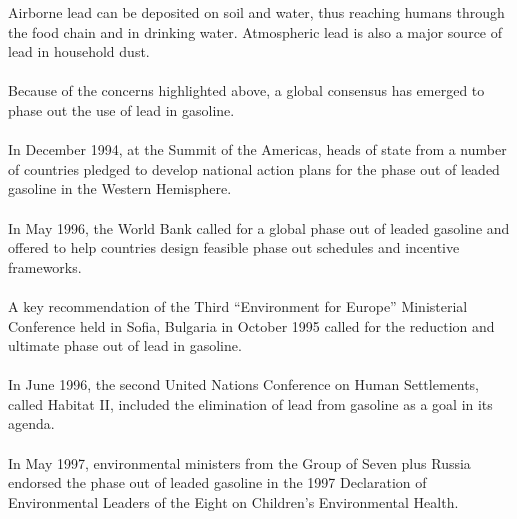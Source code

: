 Airborne lead can be deposited on soil and water, thus reaching humans through the food chain and in drinking water. Atmospheric lead is also a major source of lead in household dust.\\\\
Because of the concerns highlighted above, a global consensus has emerged to phase out the use of lead in gasoline.\\\\
In December 1994, at the Summit of the Americas, heads of state from a number of countries pledged to develop national action plans for the phase out of leaded gasoline in the Western Hemisphere.\\\\
In May 1996, the World Bank called for a global phase out of leaded gasoline and offered to help countries design feasible phase out schedules and incentive frameworks.\\\\
A key recommendation of the Third “Environment for Europe” Ministerial Conference held in Sofia, Bulgaria in October 1995 called for the reduction and ultimate phase out of lead in gasoline.\\\\
In June 1996, the second United Nations Conference on Human Settlements, called Habitat II, included the elimination of lead from gasoline as a goal in its agenda.\\\\
In May 1997, environmental ministers from the Group of Seven plus Russia endorsed the phase out of leaded gasoline in the 1997 Declaration of Environmental Leaders of the Eight on Children’s Environmental Health.
